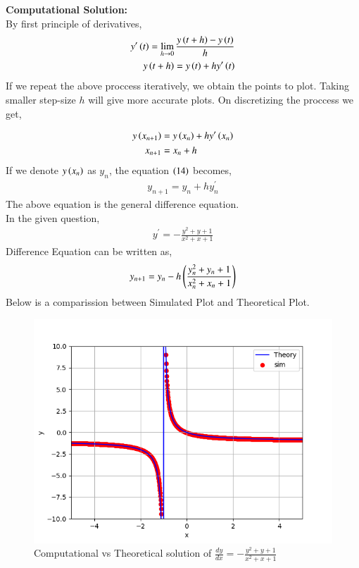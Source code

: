 \documentclass[journal]{IEEEtran}
\begin{document}
\textbf{Computational Solution:}\\
By first principle of derivatives,
\begin{align}
    y^{\prime}\left(t\right) = \lim_{h\to 0}\frac{y\left(t+h\right) - y\left(t\right)}{h}\\
    y\left(t+h\right) = y\left(t\right) + hy^{\prime}\left(t\right)
\end{align}
If we repeat the above proccess iteratively, we obtain the points to plot. Taking smaller step-size $h$ will give more accurate plots. On discretizing the proccess we get,

\begin{align}  
  y\left(x_{n+1}\right)&=y\left(x_n\right) + h y^{\prime}\left(x_n\right)\\
  x_{n+1}&=x_n+h
\end{align}
If we denote $y\left(x_n\right)$ as $y_n$, the equation $\left(14\right)$ becomes,
\begin{align}
  y_{n+1}=y_n+hy^{\prime}_n
\end{align}
The above equation is the general difference equation.\\

In the given question,
\begin{align}
  y^{\prime}=-\frac{y^2+y+1}{x^2+x+1}
\end{align}
Difference Equation can be written as,
\begin{align}
  y_{n+1}=y_n- h \left(\frac{y_n^2+y_n+1}{x_n^2+x_n+1}
\right)
\end{align}
Below is a comparission between Simulated Plot and Theoretical Plot.
\begin{figure}[h!]
   \centering
   \includegraphics[width=1\columnwidth]{figs/fig.png}
   \caption{Computational vs Theoretical solution of $ \frac{dy}{dx}=-\frac{y^2+y+1}{x^2+x+1}$}
   \label{stemplot}
\end{figure}
\end{document}
